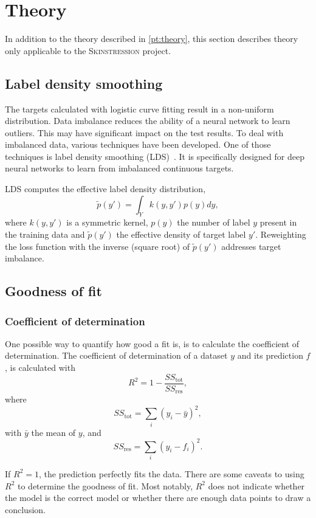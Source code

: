 \section{Theory}

In addition to the theory described in \cref{pt:theory}, this section describes theory only applicable to the \textsc{Skinstression} project.


\subsection{Label density smoothing}
The targets calculated with logistic curve fitting result in a non-uniform distribution.
Data imbalance reduces the ability of a neural network to learn outliers.
This may have significant impact on the test results.
To deal with imbalanced data, various techniques have been developed.
One of those techniques is label density smoothing (LDS)~\cite{yang2021delving}.
It is specifically designed for deep neural networks to learn from imbalanced continuous targets.

\newcommand{\edtl}{$\tilde{p}(y')$ }
LDS computes the effective label density distribution,
\begin{equation}
    \tilde{p}(y') = \int_Y k(y, y')p(y)dy,
\end{equation}
where $k(y,y')$ is a symmetric kernel, $p(y)$ the number of label $y$ present in the training data and \edtl the effective density of target label $y'$.
Reweighting the loss function with the inverse (square root) of \edtl addresses target imbalance.

\subsection{Goodness of fit}

\subsubsection{Coefficient of determination}\label{subsec:coef_det}
One possible way to quantify how good a fit is, is to calculate the coefficient of determination.
The coefficient of determination of a dataset $y$ and its prediction $f$, is calculated with
\begin{equation}
    R^2 = 1 - \frac{SS_\mathrm{tot}}{SS_\mathrm{res}},
\end{equation}
where
\begin{equation}
    SS_\mathrm{tot} = \sum_i (y_i - \bar{y})^2,
\end{equation}
with $\bar{y}$ the mean of $y$, and
\begin{equation}
    SS_\mathrm{res} = \sum_i (y_i - f_i)^2.
\end{equation}

If $R^2 = 1$, the prediction perfectly fits the data.
There are some caveats to using $R^2$ to determine the goodness of fit.
Most notably, $R^2$ does not indicate whether the model is the correct model or whether there are enough data points to draw a conclusion.
